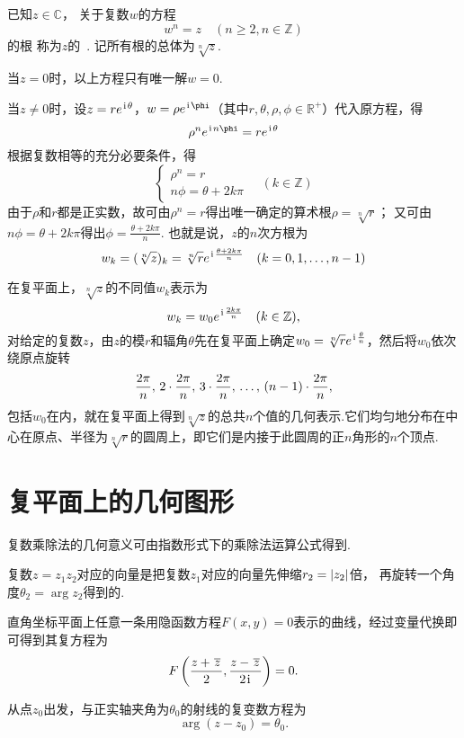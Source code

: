 \begin{definition}[复数的方根]
已知\(z\in\mathbb{C}\)，
关于复数\(w\)的方程\[
	w^n = z \quad (n \geq 2, n \in \mathbb{Z})
\]的根
称为\(z\)的~.
记所有根的总体为\(\sqrt[n]{z}\).

当\(z=0\)时，以上方程只有唯一解\(w = 0\).

当\(z \neq 0\)时，设\(z=re^{\kern1pt\mathrm{i}\kern1pt\theta}\)，\(w=\rho e^{\iu\phi}\)（其中\(r,\theta,\rho,\phi\in\mathbb{R}^+\)）代入原方程，得\[
\rho^n e^{\iu n \phi} = r e^{\iu\theta}
\]根据复数相等的充分必要条件，得\[
\left\{ \begin{array}{l}
\rho^n = r \\
n\phi = \theta + 2k\pi
\end{array} \right. \quad (k \in \mathbb{Z})
\]由于\(\rho\)和\(r\)都是正实数，故可由\(\rho^n=r\)得出唯一确定的算术根\(\rho=\sqrt[n]{r}\)；
又可由\(n\phi=\theta+2k\pi\)得出\(\phi=\frac{\theta+2k\pi}{n}\).
也就是说，\(z\)的\(n\)次方根为\[
w_k = (\sqrt[n]{z})_k = \sqrt[n]{r} e^{\kern1pt\mathrm{i}\kern1pt \frac{\theta + 2k\pi}{n}} \quad (k=0,1,\dotsc,n-1)
\]
\end{definition}

在复平面上，\(\sqrt[n]{z}\)的不同值\(w_k\)表示为\[
w_k = w_0 e^{\kern1pt\mathrm{i}\kern1pt\frac{2k\pi}{n}} \quad (k \in \mathbb{Z}),
\]对给定的复数\(z\)，由\(z\)的模\(r\)和辐角\(\theta\)先在复平面上确定\(w_0 = \sqrt[n]{r} e^{\kern1pt\mathrm{i}\kern1pt\frac{\theta}{n}}\)，然后将\(w_0\)依次绕原点旋转\[
\def\f{\frac{2\pi}{n}}
\f,\,2\cdot\f,\,3\cdot\f,\,\dots,\,(n-1)\cdot\f,
\]包括\(w_0\)在内，就在复平面上得到\(\sqrt[n]{z}\)的总共\(n\)个值的几何表示.它们均匀地分布在中心在原点、半径为\(\sqrt[n]{r}\)的圆周上，即它们是内接于此圆周的正\(n\)角形的\(n\)个顶点.

\section{复平面上的几何图形}
复数乘除法的几何意义可由指数形式下的乘除法运算公式得到.

复数\(z=z_1 z_2\)对应的向量是把复数\(z_1\)对应的向量先伸缩\(r_2 = \abs{z_2}\)倍，
再旋转一个角度\(\theta_2 = \arg z_2\)得到的.

直角坐标平面上任意一条用隐函数方程\(F(x,y)=0\)表示的曲线，经过变量代换即可得到其复方程为\[
F\left(\frac{z+\kern1pt\overline{z}\kern1pt}{2},\frac{z-\kern1pt\overline{z}\kern1pt}{2\kern1pt\mathrm{i}\kern1pt}\right)=0.
\]

\begin{example}[射线]
从点\(z_0\)出发，与正实轴夹角为\(\theta_0\)的射线的复变数方程为\[
\arg(z-z_0) = \theta_0.
\]
\end{example}

